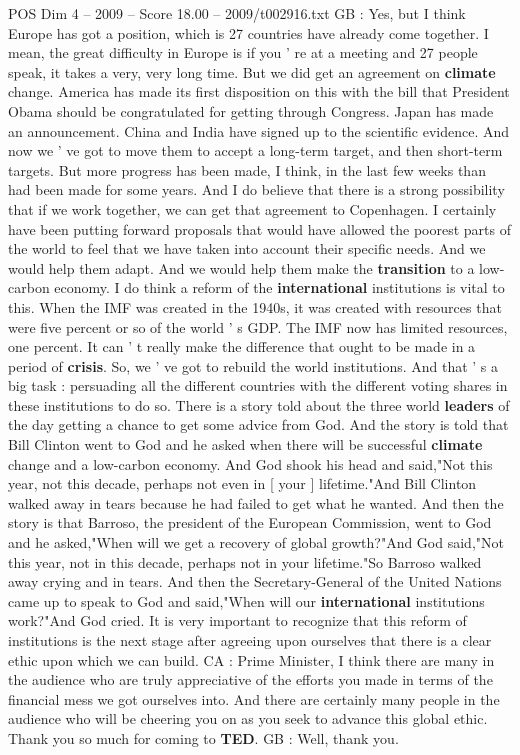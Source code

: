 \begin{textsample}{POS Dim 4 – 2009 – Score 18.00 – 2009/t002916.txt}
GB : Yes, but I think Europe has got a position, which is 27 countries have already come together.
I mean, the great difficulty in Europe is if you ' re at a meeting and 27 people speak, it takes a very, very long time.
But we did get an agreement on \textbf{climate} change.
America has made its first disposition on this with the bill that President Obama should be congratulated for getting through Congress.
Japan has made an announcement.
China and India have signed up to the scientific evidence.
And now we ' ve got to move them to accept a long-term target, and then short-term targets.
But more progress has been made, I think, in the last few weeks than had been made for some years.
And I do believe that there is a strong possibility that if we work together, we can get that agreement to Copenhagen.
I certainly have been putting forward proposals that would have allowed the poorest parts of the world to feel that we have taken into account their specific needs.
And we would help them adapt.
And we would help them make the \textbf{transition} to a low-carbon economy.
I do think a reform of the \textbf{international} institutions is vital to this.
When the IMF was created in the 1940s, it was created with resources that were five percent or so of the world ' s GDP.
The IMF now has limited resources, one percent.
It can ' t really make the difference that ought to be made in a period of \textbf{crisis}.
So, we ' ve got to rebuild the world institutions.
And that ' s a big task : persuading all the different countries with the different voting shares in these institutions to do so.
There is a story told about the three world \textbf{leaders} of the day getting a chance to get some advice from God.
And the story is told that Bill Clinton went to God and he asked when there will be successful \textbf{climate} change and a low-carbon economy.
And God shook his head and said,"Not this year, not this decade, perhaps not even in [ your ] lifetime."And Bill Clinton walked away in tears because he had failed to get what he wanted.
And then the story is that Barroso, the president of the European Commission, went to God and he asked,"When will we get a recovery of global growth?"And God said,"Not this year, not in this decade, perhaps not in your lifetime."So Barroso walked away crying and in tears.
And then the Secretary-General of the United Nations came up to speak to God and said,"When will our \textbf{international} institutions work?"And God cried.
It is very important to recognize that this reform of institutions is the next stage after agreeing upon ourselves that there is a clear ethic upon which we can build.
CA : Prime Minister, I think there are many in the audience who are truly appreciative of the efforts you made in terms of the financial mess we got ourselves into.
And there are certainly many people in the audience who will be cheering you on as you seek to advance this global ethic.
Thank you so much for coming to \textbf{TED}.
GB : Well, thank you.

\end{textsample}
